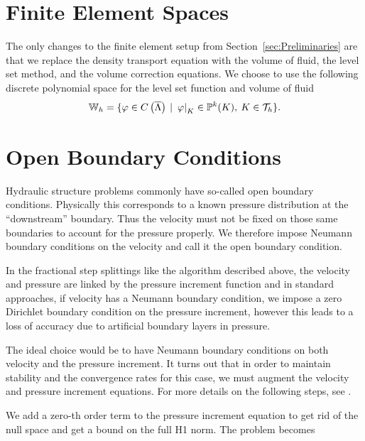 \documentclass[letterpaper]{erdc}
\begin{document}
\section{Finite Element Spaces}\label{sec:2PPreliminaries}
The only changes to the finite element setup from
Section~\ref{sec:Preliminaries} are that we replace the density transport
equation with the volume of fluid, the level set method, and the volume
correction equations.  We choose to use the following discrete polynomial space
for the level set function and volume of fluid
\begin{equation*}
\mathbb{W}_h = \{ \varphi \in C\left(\overline{\Lambda}\right) \:|\: \left.\varphi\right|_{K} \in \mathbb{P}^{k}(K),\: K\in\mathcal{T}_h \}.
\end{equation*}








%
%
%
\section{Open Boundary Conditions}\label{sec:OpenBoundaryConditions}

Hydraulic structure problems commonly have so-called open boundary
conditions. Physically this corresponds to a known pressure distribution at the
``downstream'' boundary.  Thus the velocity must not be fixed on those same
boundaries to account for the pressure properly.  We therefore impose Neumann
boundary conditions on the velocity and call it the open boundary condition.

In the fractional step splittings like the algorithm described above, the
velocity and pressure are linked by the pressure increment function and in
standard approaches, if velocity has a Neumann boundary condition, we impose a
zero Dirichlet boundary condition on the pressure increment, however this leads
to a loss of accuracy due to artificial boundary layers in pressure.

The ideal choice would be to have Neumann boundary conditions on both velocity
and the pressure increment.  It turns out that in order to maintain stability
and the convergence rates for this case, we must augment the velocity and
pressure increment equations.  For more details on the following steps, see
\cite{bonito2015modified}.

We add a zero-th order term to the pressure increment equation to get rid of
the null space and get a bound on the full H1 norm.  The problem becomes
\end{document}

